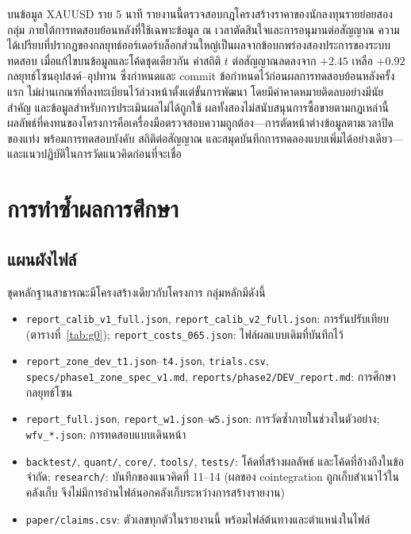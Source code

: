 \documentclass[11pt,a4paper]{article}
\newcommand{\tw}[1]{\texorpdfstring{\hspace{0pt}\mbox{#1}\hspace{0pt}}{#1}}
\begin{document}
บนข้อมูล XAUUSD ราย 5 นาที รายงานนี้\tw{ตรวจสอบ}กฎโครงสร้างราคาของนักลงทุน\tw{รายย่อย}สองกลุ่ม
ภายใต้การทดสอบย้อนหลังที่ใช้เฉพาะข้อมูล ณ เวลา\tw{ตัดสินใจ}และการอนุมานต่อสัญญาณ
ความได้เปรียบที่ปรากฏของกลยุทธ์\tw{ออร์เดอร์บล็อก}ส่วนใหญ่เป็นผลจากข้อบกพร่องสองประการของระบบทดสอบ
เมื่อแก้ไขบนข้อมูลและโค้ดชุดเดียวกัน ค่าสถิติ $t$ ต่อสัญญาณลดลงจาก $+2.45$ เหลือ $+0.92$
กลยุทธ์โซนอุปสงค์--อุปทาน ซึ่งกำหนดและ commit ข้อกำหนดไว้ก่อนผลการทดสอบย้อนหลัง\tw{ครั้งแรก}
ไม่ผ่านเกณฑ์ที่ลงทะเบียนไว้\tw{ล่วงหน้า}ตั้งแต่ขั้นการพัฒนา โดยมี\tw{ค่าคาดหมาย}ติดลบอย่างมีนัยสำคัญ
และข้อมูลสำหรับการประเมินผลไม่ได้ถูกใช้ ผลทั้งสองไม่สนับสนุนการ\tw{ซื้อขาย}ตามกฎเหล่านี้
ผลลัพธ์ที่คงทนของโครงการคือ\tw{เครื่องมือ}\tw{ตรวจสอบ}ความถูกต้อง---การตัดหน้าต่างข้อมูลตามเวลาปิดของแท่ง
พร้อมการทดสอบบังคับ สถิติต่อสัญญาณ และสมุดบันทึกการทดลองแบบเพิ่มได้อย่างเดียว---
และแนวปฏิบัติในการวัดแนวคิดก่อนที่จะเชื่อ

\FloatBarrier



\appendix
\section{การทำซ้ำผลการศึกษา}
\label{app:repro}

\subsection{แผนผังไฟล์}
ชุด\tw{หลักฐาน}สาธารณะมีโครงสร้างเดียวกับโครงการ กลุ่มหลักมีดังนี้
\begin{itemize}[before=\RaggedRight]
\item \texttt{report\_calib\_v1\_full.json}, \texttt{report\_calib\_v2\_full.json}: การรันปรับเทียบ
(\tw{ตารางที่}~\ref{tab:g0}); \texttt{report\_costs\_065.json}: ไฟล์ผลแบบเดิมที่บันทึกไว้
\item \texttt{report\_zone\_dev\_t1.json}--\texttt{t4.json}, \texttt{trials.csv},
\texttt{specs/phase1\_zone\_spec\_v1.md}, \texttt{reports/phase2/DEV\_report.md}: การศึกษากลยุทธ์โซน
\item \texttt{report\_full.json}, \texttt{report\_w1.json}--\texttt{w5.json}: การวัดซ้ำภายในช่วงในตัวอย่าง;
\texttt{wfv\_*.json}: การทดสอบแบบเดินหน้า
\item \texttt{backtest/}, \texttt{quant/}, \texttt{core/}, \texttt{tools/}, \texttt{tests/}:
โค้ดที่สร้างผลลัพธ์ และโค้ดที่อ้างถึงในข้อจำกัด; \texttt{research/}: บันทึกของ\tw{แนวคิดที่} 11--14
(ผลของ cointegration ถูกเก็บสำเนาไว้ในคลังเก็บ จึงไม่มีการอ่านไฟล์นอกคลังเก็บระหว่างการสร้างรายงาน)
\item \texttt{paper/claims.csv}: ตัวเลขทุกตัวในรายงานนี้ พร้อมไฟล์ต้นทางและตำแหน่งในไฟล์
\end{itemize}
\end{document}
